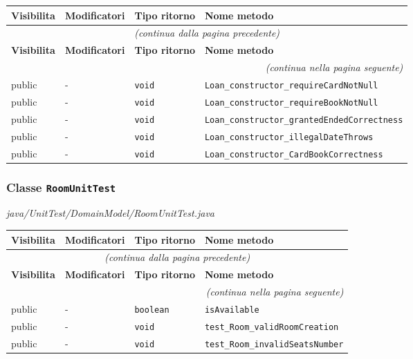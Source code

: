 \begin{longtable}{@{}llll@{}}
\toprule
\textbf{Visibilita} & \textbf{Modificatori} & \textbf{Tipo ritorno} & \textbf{Nome metodo} \\
\midrule
\endfirsthead
\multicolumn{4}{c}{\small\itshape (continua dalla pagina precedente)} \\
\toprule
\textbf{Visibilita} & \textbf{Modificatori} & \textbf{Tipo ritorno} & \textbf{Nome metodo} \\
\midrule
\endhead
\midrule
\multicolumn{4}{r}{\small\itshape (continua nella pagina seguente)} \\
\endfoot
\bottomrule
\endlastfoot
  public & - & \texttt{void} & \texttt{Loan\_constructor\_requireCardNotNull} \\
  public & - & \texttt{void} & \texttt{Loan\_constructor\_requireBookNotNull} \\
  public & - & \texttt{void} & \texttt{Loan\_constructor\_grantedEndedCorrectness} \\
  public & - & \texttt{void} & \texttt{Loan\_constructor\_illegalDateThrows} \\
  public & - & \texttt{void} & \texttt{Loan\_constructor\_CardBookCorrectness} \\
\end{longtable}

\subsubsection*{Classe \texttt{RoomUnitTest}}\label{RoomUnitTest}
{\small\textit{java/UnitTest/DomainModel/RoomUnitTest.java}}
\vspace{4pt}

\begin{longtable}{@{}llll@{}}
\toprule
\textbf{Visibilita} & \textbf{Modificatori} & \textbf{Tipo ritorno} & \textbf{Nome metodo} \\
\midrule
\endfirsthead
\multicolumn{4}{c}{\small\itshape (continua dalla pagina precedente)} \\
\toprule
\textbf{Visibilita} & \textbf{Modificatori} & \textbf{Tipo ritorno} & \textbf{Nome metodo} \\
\midrule
\endhead
\midrule
\multicolumn{4}{r}{\small\itshape (continua nella pagina seguente)} \\
\endfoot
\bottomrule
\endlastfoot
  public & - & \texttt{boolean} & \texttt{isAvailable} \\
  public & - & \texttt{void} & \texttt{test\_Room\_validRoomCreation} \\
  public & - & \texttt{void} & \texttt{test\_Room\_invalidSeatsNumber} \\
\end{longtable}

